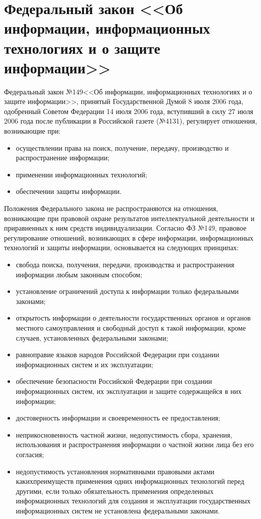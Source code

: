 \section{Федеральный закон <<Об информации, информационных технологиях и о защите информации>>} \label{rights_149}

Федеральный закон №149 <<Об информации, информационных технологиях и о защите информации>>, принятый Государственной Думой 8 июля 2006 года, одобренный Советом Федерации 14 июля 2006 года, вступивший в силу 27 июля 2006 года после публикации в Российской газете (№4131), регулирует отношения, возникающие при:
\begin{itemize}
	\item осуществлении права на поиск, получение, передачу, производство и распространение информации;
	\item применении информационных технологий;
	\item обеспечении защиты информации.
\end{itemize}

Положения Федерального закона не распространяются на отношения, возникающие при правовой охране результатов интеллектуальной деятельности и приравненных к ним средств индивидуализации.
\vspace{\baselineskip}
Согласно ФЗ №149, правовое регулирование отношений, возникающих в сфере информации, информационных технологий и защиты информации, основывается на следующих принципах:
\begin{itemize}
	\item свобода поиска, получения, передачи, производства и распространения информации любым законным способом;
	\item установление ограничений доступа к информации только федеральными законами;
	\item открытость информации о деятельности государственных органов и органов местного самоуправления и свободный доступ к такой информации, кроме случаев, установленных федеральными законами;
	\item равноправие языков народов Российской Федерации при создании информационных систем и их эксплуатации;
	\item обеспечение безопасности Российской Федерации при создании информационных систем, их эксплуатации и защите содержащейся в них информации;
	\item достоверность информации и своевременность ее предоставления;
	\item неприкосновенность частной жизни, недопустимость сбора, хранения, использования и распространения информации о частной жизни лица без его согласия;
	\item недопустимость установления нормативными правовыми актами каких преимуществ применения одних информационных технологий перед другими, если только обязательность применения определенных информационных технологий для создания и эксплуатации государственных информационных систем не установлена федеральными законами.
\end{itemize}

